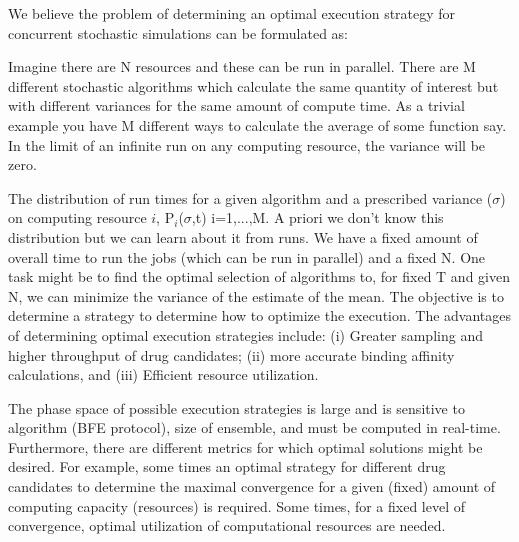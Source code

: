 \documentclass[11pt]{article}
\begin{document}
 We believe the
problem of determining an optimal execution strategy for concurrent stochastic
simulations can be formulated as:

Imagine there are N resources and these can be run in parallel. There are M
different stochastic algorithms which calculate the same quantity of interest
but with different variances for the same amount of compute time. As a trivial
example you have M different ways to calculate the average of some function
say.  In the limit of an infinite run on any computing resource, the variance
will be zero.  

The distribution of run times for a given algorithm and a prescribed variance
($\sigma$) on computing resource $i$, P$_i$($\sigma$,t) i=1,...,M. A priori we
don’t know this distribution but we can learn about it from runs. We have a
fixed amount of overall time to run the jobs (which can be run in parallel)
and a fixed N. One task might be to find the optimal selection of algorithms
to, for fixed T and given N, we can minimize the variance of the estimate of
the mean.  The objective is to determine a strategy to determine how to
optimize the execution. The advantages of determining optimal execution
strategies include: (i) Greater sampling and higher throughput of drug
candidates; (ii) more accurate binding affinity calculations, and (iii)
Efficient resource utilization.

 The phase space of possible
execution strategies is large and is sensitive to algorithm (BFE protocol),
size of ensemble, and must be computed in real-time. Furthermore, there are
different metrics for which optimal solutions might be desired. For example,
some times an optimal strategy for different drug candidates to determine the
maximal convergence for a given (fixed) amount of computing capacity
(resources) is required. Some times, for a fixed level of convergence, optimal
utilization of computational resources are needed.


\end{document}
